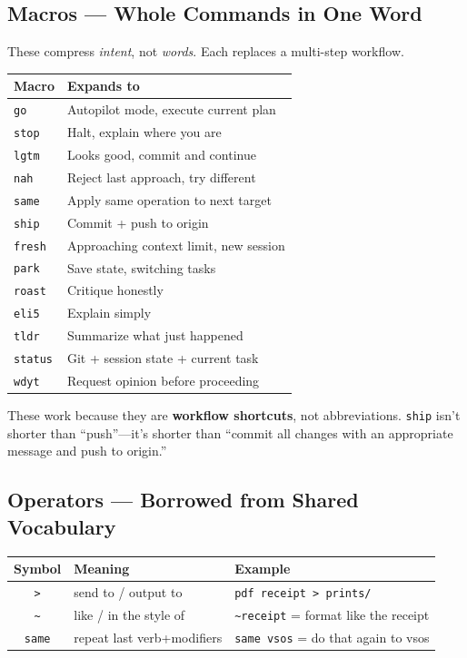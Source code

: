 \documentclass[9pt, letterpaper]{article}
\newcommand{\code}[1]{\texttt{#1}}
\begin{document}
\subsection{Macros --- Whole Commands in One Word}

These compress \textit{intent}, not \textit{words}. Each replaces a multi-step workflow.

\vspace{0.2em}
{\small
\renewcommand{\arraystretch}{1.1}
\begin{tabularx}{\textwidth}{@{} l X @{}}
\toprule
\textbf{Macro} & \textbf{Expands to} \\
\midrule
\code{go} & Autopilot mode, execute current plan \\
\code{stop} & Halt, explain where you are \\
\code{lgtm} & Looks good, commit and continue \\
\code{nah} & Reject last approach, try different \\
\code{same} & Apply same operation to next target \\
\code{ship} & Commit + push to origin \\
\code{fresh} & Approaching context limit, new session \\
\code{park} & Save state, switching tasks \\
\code{roast} & Critique honestly \\
\code{eli5} & Explain simply \\
\code{tldr} & Summarize what just happened \\
\code{status} & Git + session state + current task \\
\code{wdyt} & Request opinion before proceeding \\
\bottomrule
\end{tabularx}
}

\vspace{0.2em}
These work because they are \textbf{workflow shortcuts}, not abbreviations. \code{ship} isn't shorter than ``push''---it's shorter than ``commit all changes with an appropriate message and push to origin.''

\subsection{Operators --- Borrowed from Shared Vocabulary}

{\small
\begin{tabularx}{\textwidth}{@{} c l X @{}}
\toprule
\textbf{Symbol} & \textbf{Meaning} & \textbf{Example} \\
\midrule
\code{>} & send to / output to & \code{pdf receipt > prints/} \\
\code{\textasciitilde} & like / in the style of & \code{\textasciitilde receipt} = format like the receipt \\
\code{same} & repeat last verb+modifiers & \code{same vsos} = do that again to vsos \\
\bottomrule
\end{tabularx}
}
\end{document}
